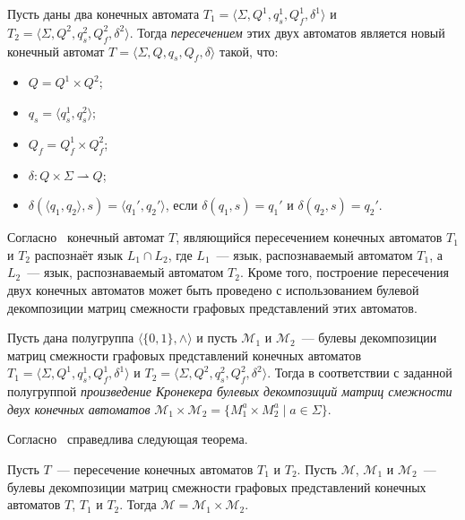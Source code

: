 \begin{definition}\label{def:FAintersection}
Пусть даны два конечных автомата 
$T_1 = \langle \Sigma, Q^1, q_s^1, Q_f^1, \delta^1 \rangle$ и $T_2 = \langle \Sigma, Q^2, q_s^2, Q_f^2, \delta^2 \rangle$. Тогда \textit{пересечением} этих двух автоматов является новый конечный автомат $T = \langle \Sigma, Q, q_s, Q_f, \delta \rangle$ такой, что:
\begin{itemize}
    \item $Q = Q^1 \times Q^2$;
    \item $q_s = \langle q_s^1, q_s^2 \rangle$;
    \item $Q_f = Q_f^1 \times Q_f^2$;
    \item $\delta: Q \times \Sigma \rightharpoonup Q$;
    \item $\delta (\langle q_1, q_2 \rangle, s) = \langle q_1', q_2' \rangle$, если $\delta(q_1, s)=q_1'$ и $\delta(q_2, s)=q_2'$.
\end{itemize}
\end{definition}

Согласно~\cite{hopcroft2001introduction} конечный автомат $T$, являющийся пересечением конечных автоматов $T_1$ и $T_2$ распознаёт язык $L_1 \cap L_2$, где $L_1$~--- язык, распознаваемый автоматом $T_1$, а $L_2$~--- язык, распознаваемый автоматом $T_2$. Кроме того, построение пересечения двух конечных автоматов может быть проведено с использованием булевой декомпозиции матриц смежности графовых представлений этих автоматов.

\begin{definition}\label{def:FAkron}
Пусть дана полугруппа $\langle \{0, 1\}, \wedge \rangle$ и пусть $\mathcal{M}_1$ и $\mathcal{M}_2$~--- булевы декомпозиции матриц смежности графовых представлений конечных автоматов $T_1 = \langle \Sigma, Q^1, q_s^1, Q_f^1, \delta^1 \rangle$ и $T_2 = \langle \Sigma, Q^2, q_s^2, Q_f^2, \delta^2 \rangle$. Тогда в соответствии с заданной полугруппой \textit{произведение Кронекера булевых декомпозиций матриц смежности двух конечных автоматов} $\mathcal{M}_1 \times \mathcal{M}_2 = \{M^a_1 \times M^a_2 \mid a \in \Sigma\}$.
\end{definition}

Согласно~\cite{rivera2017euro} справедлива следующая теорема.

\begin{theorem}\label{thm:FAintersection_and_kron}
 Пусть $T$~--- пересечение конечных автоматов $T_1$ и $T_2$. Пусть $\mathcal{M}$, $\mathcal{M}_1$ и $\mathcal{M}_2$~--- булевы декомпозиции матриц смежности графовых представлений конечных автоматов $T$, $T_1$ и $T_2$. Тогда $\mathcal{M} = \mathcal{M}_1 \times \mathcal{M}_2$.
\end{theorem}
 
